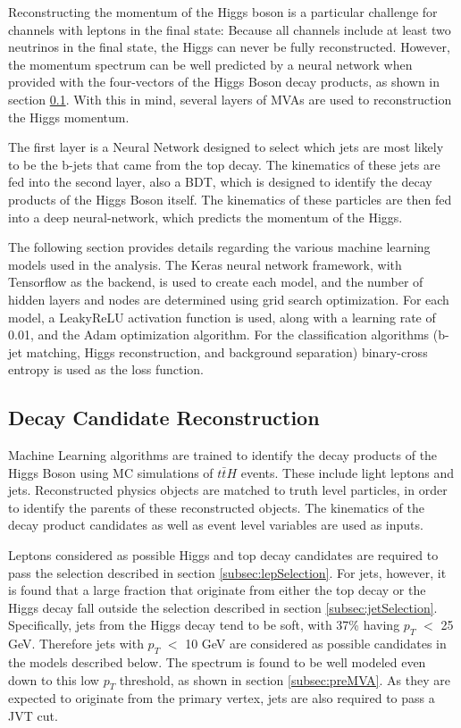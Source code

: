 Reconstructing the momentum of the Higgs boson is a particular challenge for channels with leptons in the final state: Because all channels include at least two neutrinos in the final state, the Higgs can never be fully reconstructed. However, the momentum spectrum can be well predicted by a neural network when provided with the four-vectors of the Higgs Boson decay products, as shown in section \ref{sec:truthLevelReco}. With this in mind, several layers of MVAs are used to reconstruction the Higgs momentum. 

The first layer is a Neural Network designed to select which jets are most likely to be the b-jets that came from the top decay. The kinematics of these jets are fed into the second layer, also a BDT, which is designed to identify the decay products of the Higgs Boson itself. The kinematics of these particles are then fed into a deep neural-network, which predicts the momentum of the Higgs.

The following section provides details regarding the various machine learning models used in the analysis. The Keras neural network framework, with Tensorflow as the backend, is used to create each model, and the number of hidden layers and nodes are determined using grid search optimization. For each model, a LeakyReLU activation function is used, along with a learning rate of 0.01, and the Adam optimization algorithm. For the classification algorithms (b-jet matching, Higgs reconstruction, and background separation) binary-cross entropy is used as the loss function.

\subsection{Decay Candidate Reconstruction}
\label{sec:truthLevelReco}

Machine Learning algorithms are trained to identify the decay products of the Higgs Boson using MC simulations of $t\bar{t}H$ events. These include light leptons and jets. Reconstructed physics objects are matched to truth level particles, in order to identify the parents of these reconstructed objects. The kinematics of the decay product candidates as well as event level variables are used as inputs. 

Leptons considered as possible Higgs and top decay candidates are required to pass the selection described in section \ref{subsec:lepSelection}. For jets, however, it is found that a large fraction that originate from either the top decay or the Higgs decay fall outside the selection described in section \ref{subsec:jetSelection}. Specifically, jets from the Higgs decay tend to be soft, with 37\% having $p_T$ $<$ 25 GeV. Therefore jets with $p_T$ $<$ 10 GeV are considered as possible candidates in the models described below. The spectrum is found to be well modeled even down to this low $p_T$ threshold, as shown in section \ref{subsec:preMVA}. As they are expected to originate from the primary vertex, jets are also required to pass a JVT cut.

